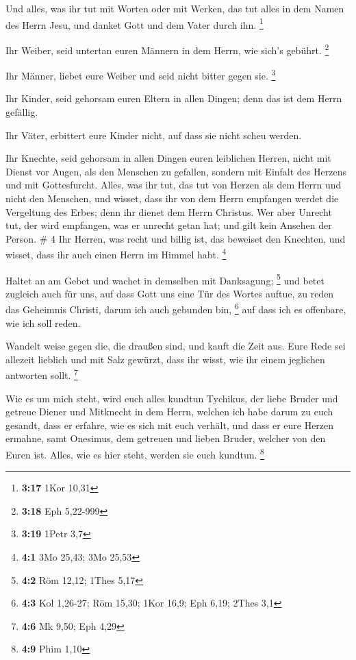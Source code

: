  Und alles, was ihr tut mit Worten oder mit Werken, das
tut alles in dem Namen des Herrn Jesu, und danket Gott und dem Vater
durch ihn. \footnote{\textbf{3:17} 1Kor 10,31}

 Ihr Weiber, seid untertan euren Männern in dem Herrn,
wie sich's gebührt. \footnote{\textbf{3:18} Eph 5,22-999}

 Ihr Männer, liebet eure Weiber und seid nicht bitter
gegen sie. \footnote{\textbf{3:19} 1Petr 3,7}

 Ihr Kinder, seid gehorsam euren Eltern in allen Dingen;
denn das ist dem Herrn gefällig.

 Ihr Väter, erbittert eure Kinder nicht, auf dass sie
nicht scheu werden.

 Ihr Knechte, seid gehorsam in allen Dingen euren
leiblichen Herren, nicht mit Dienst vor Augen, als den Menschen zu
gefallen, sondern mit Einfalt des Herzens und mit Gottesfurcht.
 Alles, was ihr tut, das tut von Herzen als dem Herrn und
nicht den Menschen,  und wisset, dass ihr von dem Herrn
empfangen werdet die Vergeltung des Erbes; denn ihr dienet dem Herrn
Christus.  Wer aber Unrecht tut, der wird empfangen, was
er unrecht getan hat; und gilt kein Ansehen der Person. \# 4
 Ihr Herren, was recht und billig ist, das beweiset den
Knechten, und wisset, dass ihr auch einen Herrn im Himmel habt.
\footnote{\textbf{4:1} 3Mo 25,43; 3Mo 25,53}

 Haltet an am Gebet und wachet in demselben mit
Danksagung; \footnote{\textbf{4:2} Röm 12,12; 1Thes 5,17} 
und betet zugleich auch für uns, auf dass Gott uns eine Tür des Wortes
auftue, zu reden das Geheimnis Christi, darum ich auch gebunden bin,
\footnote{\textbf{4:3} Kol 1,26-27; Röm 15,30; 1Kor 16,9; Eph 6,19;
  2Thes 3,1}  auf dass ich es offenbare, wie ich soll
reden.

 Wandelt weise gegen die, die draußen sind, und kauft die
Zeit aus.  Eure Rede sei allezeit lieblich und mit Salz
gewürzt, dass ihr wisst, wie ihr einem jeglichen antworten sollt.
\footnote{\textbf{4:6} Mk 9,50; Eph 4,29}

 Wie es um mich steht, wird euch alles kundtun Tychikus,
der liebe Bruder und getreue Diener und Mitknecht in dem Herrn,
 welchen ich habe darum zu euch gesandt, dass er erfahre,
wie es sich mit euch verhält, und dass er eure Herzen ermahne,
 samt Onesimus, dem getreuen und lieben Bruder, welcher
von den Euren ist. Alles, wie es hier steht, werden sie euch kundtun.
\footnote{\textbf{4:9} Phim 1,10}

